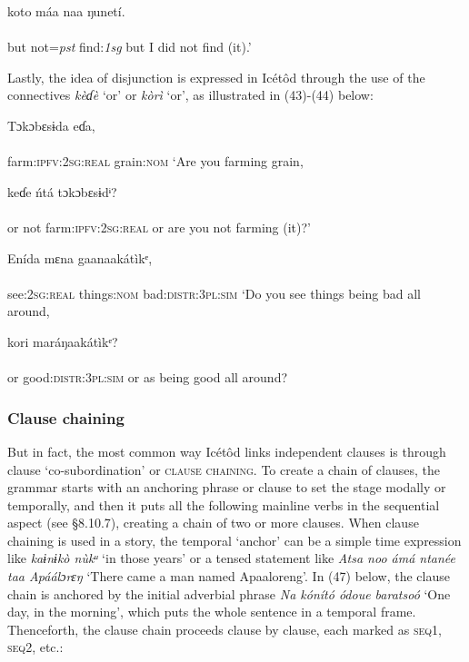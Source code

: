 \ea\label{ex:}
\gll koto   máa naa   ŋunetí. \\
    \\
but   not=\textit{pst}   find:\textit{1sg}
\glt but I did not find (it).’
\z  

Lastly, the idea of disjunction is expressed in Icétôd through the use of the connectives \textit{kèɗè} ‘or’ or \textit{kòrì} ‘or’, as illustrated in (43)-(44) below:



\ea\label{ex:}
\gll Tɔkɔbɛsɨda       eɗa,  \\
    \\
farm:\textsc{ipfv:2sg:real}   grain:\textsc{nom}
\glt ‘Are you farming grain, 
\z



\ea\label{ex:}
\gll keɗe   ńtá   tɔkɔbɛsɨdᶤ? \\
    \\
or   not   farm:\textsc{ipfv:2sg:real}
\glt or are you not farming (it)?’
\z  



\ea\label{ex:}
\gll Enída       mɛna     gaanaakátìkᵉ, \\
    \\
see:\textsc{2sg:real}   things:\textsc{nom}   bad:\textsc{distr:3pl:sim}
\glt ‘Do you see things being bad all around, 
\z



\ea\label{ex:}
\gll kori   maráŋaakátìkᵉ? \\
    \\
or   good:\textsc{distr:3pl:sim}
\glt or as being good all around?
\z  



\subsubsection{Clause chaining}

But in fact, the most common way Icétôd links independent clauses is through clause ‘co-subordination’ or \textsc{clause chaining}. To create a chain of clauses, the grammar starts with an anchoring phrase or clause to set the stage modally or temporally, and then it puts all the following mainline verbs in the sequential aspect (see §8.10.7), creating a chain of two or more clauses. When clause chaining is used in a story, the temporal ‘anchor’ can be a simple time expression like \textit{kaɨnɨkò nùkᵘ} ‘in those years’ or a tensed statement like \textit{Atsa noo ámá ntanée taa Apáálɔrɛŋ} ‘There came a man named Apaaloreng’. In (47) below, the clause chain is anchored by the initial adverbial phrase \textit{Na kónít}\textit{ó ódoue baratsoó} ‘One day, in the morning’, which puts the whole sentence in a temporal frame. Thenceforth, the clause chain proceeds clause by clause, each marked as \textsc{seq1}, \textsc{seq2}, etc.:




